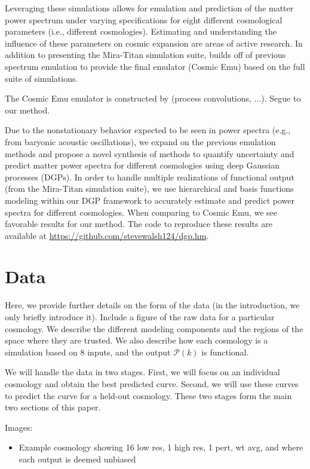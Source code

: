 \documentclass[11pt]{article}
\begin{document}
Leveraging these simulations allows for emulation and prediction of the matter power spectrum under varying specifications for eight different cosmological parameters (i.e., different cosmologies). Estimating and understanding the influence of these parameters on cosmic expansion are areas of active research. In addition to presenting the Mira-Titan simulation suite, \cite{moran2023mira} builds off of previous spectrum emulation \citep{lawrence2017mira} to provide the final emulator (Cosmic Emu) based on the full suite of simulations.

The Cosmic Emu emulator is constructed by (process convolutions, ...). Segue to our method. 

Due to the nonstationary behavior expected to be seen in power spectra (e.g., from baryonic acoustic oscillations), we expand on the previous emulation methods and propose a novel synthesis of methods to quantify uncertainty and predict matter power spectra for different cosmologies using deep Gaussian processes (DGPs). In order to handle multiple realizations of functional output (from the Mira-Titan simulation suite), we use hierarchical and basis functions modeling within our DGP framework to accurately estimate and predict power spectra for different cosmologies. When comparing to Cosmic Emu, we see favorable results for our method. The code to reproduce these results are available at \url{https://github.com/stevewalsh124/dgp.hm}.

\section{Data}

Here, we provide further details on the form of the data (in the introduction, we only briefly introduce it).  Include a figure of the raw data for a particular cosmology.  We describe the different modeling components and the regions of the space where they are trusted.  We also describe how each cosmology is a simulation based on 8 inputs, and the output $\mathcal{P}(k)$ is functional.

We will handle the data in two stages.  First, we will focus on an individual cosmology and obtain the best predicted curve.  Second, we will use these curves to predict the curve for a held-out cosmology.  These two stages form the main two sections of this paper.

Images:
\begin{itemize}
    \item Example cosmology showing 16 low res, 1 high res, 1 pert, wt avg, and where each output is deemed unbiased
\end{itemize}
\end{document}
